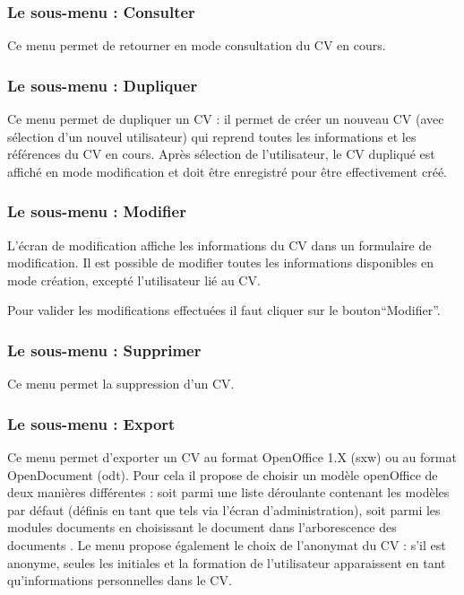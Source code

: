\subsubsection{Le sous-menu : Consulter}

Ce menu permet de retourner en mode consultation du CV en cours.

\subsubsection{Le sous-menu : Dupliquer}

Ce menu permet de dupliquer un CV : il permet de créer un nouveau CV (avec sélection d'un nouvel utilisateur) qui reprend toutes les informations et les références du CV en cours. Après sélection de l'utilisateur, le CV dupliqué est affiché en mode modification et doit être enregistré pour être effectivement créé.

\subsubsection{Le sous-menu : Modifier}

L'écran de modification affiche les informations du CV dans un formulaire de modification.
Il est possible de modifier toutes les informations disponibles en mode création, excepté l'utilisateur lié au CV.

Pour valider les modifications effectuées il faut cliquer sur le bouton``Modifier''.

\subsubsection{Le sous-menu : Supprimer}

Ce menu permet la suppression d'un CV.

\subsubsection{Le sous-menu : Export}

Ce menu permet d'exporter un CV au format OpenOffice 1.X (sxw) ou au format OpenDocument (odt). Pour cela il propose de choisir un modèle openOffice de deux manières différentes : soit parmi une liste déroulante contenant les modèles par défaut (définis en tant que tels via l'écran d'administration), soit parmi les modules documents \obm en choisissant le document dans l'arborescence des documents \obm.  
Le menu propose également le choix de l'anonymat du CV : s'il est anonyme, seules les initiales et la formation de l'utilisateur apparaissent en tant qu'informations personnelles dans le CV.


